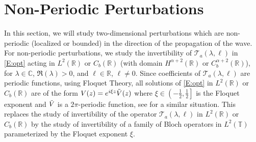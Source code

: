 \documentclass[12pt]{amsart}    %
\newcommand{\R}{\mathbb{R}}
\newcommand{\C}{\mathbb{C}}
\newtheorem{lemma}[theorem]{Lemma}
\numberwithin{equation}{section}
\begin{document}

\section{Non-Periodic Perturbations} \label{sec:nonperperturb}
In this section, we will study two-dimensional perturbations which are non-periodic (localized or bounded) in the direction of the propagation of the wave. For non-periodic perturbations, we study the invertibility of $\mathcal{T}_a(\lambda, \ell)$ in \eqref{E:opt} acting in $L^2(\R)$ or $C_b(\R)$ (with domain $H^{\alpha+2}(\R)$ or   $C_b^{\alpha+2}(\R)$),
for $\lambda\in\C$, $\Re(\lambda)>0$, and $\ell\in\R$, $\ell\neq0$. 
Since coefficients of $\mathcal T_a(\lambda,\ell)$  are periodic functions, using Floquet Theory, all solutions of \eqref{E:opt} in $L^2(\R)$ or $C_b(\R)$ are of the form $V(z)=e^{i\xi z}\Tilde{V}(z)$ where $\xi\in\left(-\frac12,\frac12\right]$ is the Floquet exponent and $\Tilde{V}$ is a $2\pi$-periodic function, see \cite{Haragus2008STABILITYEQUATION} for a similar situation. This replaces the study of invertibility of the operator $\mathcal T_a(\lambda,\ell)$ in $L^2(\R)$ or $C_b(\R)$ by the study of invertibility of a family of Bloch operators in $L^2(\mathbb{T})$ parameterized by the Floquet exponent $\xi$. 
\end{document}
